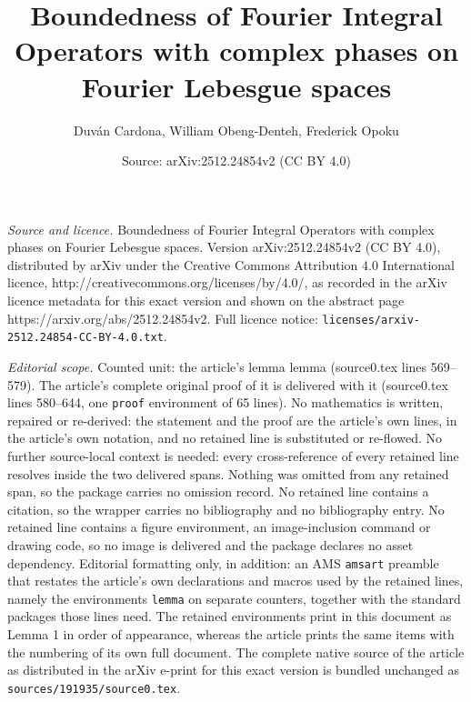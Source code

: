 \documentclass[10pt,a4paper]{amsart}
\title{Boundedness of Fourier Integral Operators with complex phases on Fourier Lebesgue spaces}
\author{Duv\'an Cardona, William Obeng-Denteh, Frederick Opoku}
\date{Source: arXiv:2512.24854v2 (CC BY 4.0)}
\begin{document}
\maketitle

\noindent\emph{Source and licence.} Boundedness of Fourier Integral Operators with complex phases on Fourier Lebesgue spaces. Version arXiv:2512.24854v2 (CC BY 4.0), distributed by arXiv under the Creative Commons Attribution 4.0 International licence, http://creativecommons.org/licenses/by/4.0/, as recorded in the arXiv licence metadata for this exact version and shown on the abstract page https://arxiv.org/abs/2512.24854v2. Full licence notice: \texttt{licenses/arxiv-2512.24854-CC-BY-4.0.txt}.\par\smallskip

\noindent\textit{Editorial scope.} Counted unit: the article's lemma lemma (source0.tex lines 569--579). The article's complete original proof of it is delivered with it (source0.tex lines 580--644, one \texttt{proof} environment of 65 lines). No mathematics is written, repaired or re-derived: the statement and the proof are the article's own lines, in the article's own notation, and no retained line is substituted or re-flowed.  No further source-local context is needed: every cross-reference of every retained line resolves inside the two delivered spans.  Nothing was omitted from any retained span, so the package carries no omission record.  No retained line contains a citation, so the wrapper carries no bibliography and no bibliography entry.  No retained line contains a figure environment, an image-inclusion command or drawing code, so no image is delivered and the package declares no asset dependency.  Editorial formatting only, in addition: an AMS \texttt{amsart} preamble that restates the article's own declarations and macros used by the retained lines, namely the environments \texttt{lemma} on separate counters, together with the standard packages those lines need.  The retained environments print in this document as Lemma 1 in order of appearance, whereas the article prints the same items with the numbering of its own full document.  The complete native source of the article as distributed in the arXiv e-print for this exact version is bundled unchanged as \texttt{sources/191935/source0.tex}.
\end{document}
